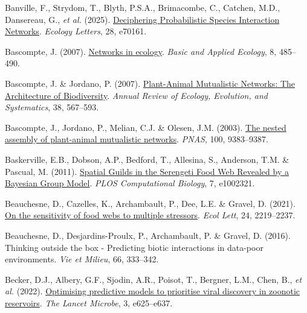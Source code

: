 \documentclass[
]{article}
\newlength{\cslhangindent}
\newenvironment{CSLReferences}[2] %
 {\begin{list}{}{%
  \setlength{\itemindent}{0pt}
  \setlength{\leftmargin}{0pt}
  \setlength{\parsep}{0pt}
  \ifodd #1
   \setlength{\leftmargin}{\cslhangindent}
   \setlength{\itemindent}{-1\cslhangindent}
  \fi
  \setlength{\itemsep}{#2\baselineskip}}}
 {\end{list}}
\begin{document}
\begin{CSLReferences}{1}{0}
Banville, F., Strydom, T., Blyth, P.S.A., Brimacombe, C., Catchen, M.D.,
Dansereau, G., \emph{et al.} (2025).
\href{https://doi.org/10.1111/ele.70161}{Deciphering {Probabilistic
Species Interaction Networks}}. \emph{Ecology Letters}, 28, e70161.

Bascompte, J. (2007).
\href{https://doi.org/10.1016/j.baae.2007.06.003}{Networks in ecology}.
\emph{Basic and Applied Ecology}, 8, 485--490.

Bascompte, J. \& Jordano, P. (2007).
\href{https://doi.org/10.1146/annurev.ecolsys.38.091206.095818}{Plant-{Animal
Mutualistic Networks}: {The Architecture} of {Biodiversity}}.
\emph{Annual Review of Ecology, Evolution, and Systematics}, 38,
567--593.

Bascompte, J., Jordano, P., Melian, C.J. \& Olesen, J.M. (2003).
\href{https://doi.org/10.1073/pnas.1633576100}{The nested assembly of
plant-animal mutualistic networks}. \emph{PNAS}, 100, 9383--9387.

Baskerville, E.B., Dobson, A.P., Bedford, T., Allesina, S., Anderson,
T.M. \& Pascual, M. (2011).
\href{https://doi.org/10.1371/journal.pcbi.1002321}{Spatial {Guilds} in
the {Serengeti Food Web Revealed} by a {Bayesian Group Model}}.
\emph{PLOS Computational Biology}, 7, e1002321.

Beauchesne, D., Cazelles, K., Archambault, P., Dee, L.E. \& Gravel, D.
(2021). \href{https://doi.org/10.1111/ele.13841}{On the sensitivity of
food webs to multiple stressors}. \emph{Ecol Lett}, 24, 2219--2237.

Beauchesne, D., Desjardins-Proulx, P., Archambault, P. \& Gravel, D.
(2016). Thinking outside the box - {Predicting} biotic interactions in
data-poor environments. \emph{Vie et Milieu}, 66, 333--342.

Becker, D.J., Albery, G.F., Sjodin, A.R., Poisot, T., Bergner, L.M.,
Chen, B., \emph{et al.} (2022).
\href{https://doi.org/10.1016/S2666-5247(21)00245-7}{Optimising
predictive models to prioritise viral discovery in zoonotic reservoirs}.
\emph{The Lancet Microbe}, 3, e625--e637.


\end{CSLReferences}
\end{document}
